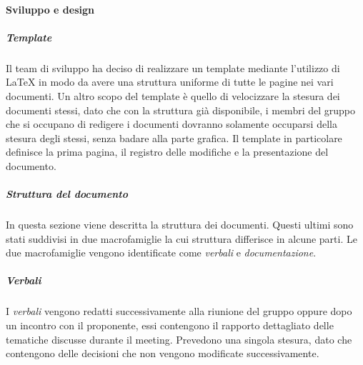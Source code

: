 \paragraph{Sviluppo e design}\label{paragraph:sviluppo_design}
\subparagraph{Template}
Il team di sviluppo ha deciso di realizzare un template mediante l'utilizzo di \LaTeX{} in modo da avere una struttura uniforme di tutte le pagine nei vari documenti.
Un altro scopo del template è quello di velocizzare la stesura dei documenti stessi, dato che con la struttura già disponibile, i membri del gruppo che si occupano di redigere i documenti dovranno solamente occuparsi della stesura degli stessi, senza badare alla parte grafica.
Il template in particolare definisce la prima pagina, il registro delle modifiche e la presentazione del documento.
\subparagraph{Struttura del documento}
In questa sezione viene descritta la struttura dei documenti. Questi ultimi sono stati suddivisi in due macrofamiglie la cui struttura differisce in alcune parti. Le due macrofamiglie vengono identificate come \textit{verbali} e \textit{documentazione}.
\subparagraph{Verbali}

I \textit{verbali} vengono redatti successivamente alla riunione del gruppo oppure dopo un incontro con il proponente, essi contengono il rapporto dettagliato delle tematiche discusse durante il meeting.
Prevedono una singola stesura, dato che contengono delle decisioni che non vengono modificate successivamente.

